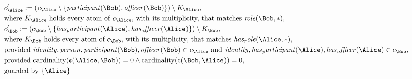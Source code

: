 \begin{align*}
&
c'_
{
\Alice
}
 := 
(c_
{
\Alice
}
 \setminus 
\{
\mathit{
participant
}
(
\Bob
)
,
\mathit{
officer
}
(
\Bob
)
\}
) \setminus K_
{
\Alice
}
,\\
&
\text{where } K_
{
\Alice
}
 \text{ holds every atom of } c_
{
\Alice
}
 \text{, with its multiplicity, that matches } 
\mathit{
role
}
(
\Bob
,
\ast
)
,\\
&
c'_
{
\Bob
}
 := 
(c_
{
\Bob
}
 \setminus 
\{
\mathit{
has_participant
}
(
\Alice
)
,
\mathit{
has_officer
}
(
\Alice
)
\}
) \setminus K_
{
\Bob
}
,\\
&
\text{where } K_
{
\Bob
}
 \text{ holds every atom of } c_
{
\Bob
}
 \text{, with its multiplicity, that matches } 
\mathit{
has_role
}
(
\Alice
,
\ast
)
,\\
&
\text{provided } 
\mathit{
identity
}
,
\mathit{
person
}
,
\mathit{
participant
}
(
\Bob
)
,
\mathit{
officer
}
(
\Bob
)
 \in c_
{
\Alice
}
 \text{ and } 
\mathit{
identity
}
,
\mathit{
has_participant
}
(
\Alice
)
,
\mathit{
has_officer
}
(
\Alice
)
 \in c_
{
\Bob
}
,\\
&
\text{provided } 
\mathrm{cardinality}(
\text{\textcent}
(
\Alice
,
\Bob
)
)
=
0
\land
\mathrm{cardinality}(
\text{\textcent}
(
\Bob
,
\Alice
)
)
=
0
,\\
&
\text{guarded by } \{
\Alice
\}
\end{align*}

